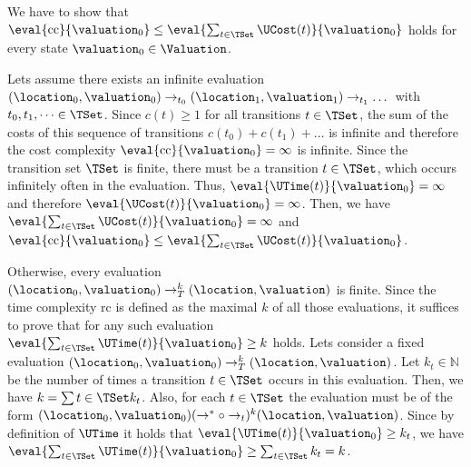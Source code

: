 We have to show that $\eval{\text{cc}}{\valuation_0} \leq \eval{\sum_{t \in \TSet}\UCost(t)}{\valuation_0}$ holds for every state $\valuation_0 \in \Valuation$.

Lets assume there exists an infinite evaluation $(\location_0, \valuation_0) \rightarrow_{t_0} (\location_1, \valuation_1) \rightarrow_{t_1} \dots$ with $t_0, t_1, \dots \in \TSet$.
Since $c(t) \geq 1$ for all transitions $t \in \TSet$, the sum of the costs of this sequence of transitions $c(t_0) + c(t_1) + \dots$ is infinite and therefore the cost complexity $\eval{\text{cc}}{\valuation_0} = \infty$ is infinite.
Since the transition set $\TSet$ is finite, there must be a transition $t \in \TSet$, which occurs infinitely often in the evaluation.
Thus, $\eval{\UTime(t)}{\valuation_0} = \infty$ and therefore $\eval{\UCost(t)}{\valuation_0} = \infty$.
Then, we have $\eval{\sum_{t \in \TSet}\UCost(t)}{\valuation_0} = \infty$ and $\eval{\text{cc}}{\valuation_0} \leq \eval{\sum_{t \in \TSet}\UCost(t)}{\valuation_0}$.


Otherwise, every evaluation $(\location_0, \valuation_0) \rightarrow^k_T (\location, \valuation)$ is finite.
Since the time complexity $\text{rc}$ is defined as the maximal $k$ of all those evaluations, it suffices to prove that for any such evaluation $\eval{\sum_{t \in \TSet}\UTime(t)}{\valuation_0} \geq k$ holds.
Lets consider a fixed evaluation $(\location_0, \valuation_0) \rightarrow^k_T (\location, \valuation)$.
Let $k_t \in \mathbb{N}$ be the number of times a transition $t \in \TSet$ occurs in this evaluation.
Then, we have $k = \sum{t \in \TSet} k_t$.
Also, for each $t \in \TSet$ the evaluation must be of the form $(\location_0, \valuation_0) (\rightarrow^* \circ \rightarrow_t)^k (\location, \valuation)$.
Since by definition of $\UTime$ it holds that $\eval{\UTime(t)}{\valuation_0} \geq k_t$, we have $\eval{\sum_{t \in \TSet}\UTime(t)}{\valuation_0} \geq \sum_{t \in \TSet} k_t = k$.
